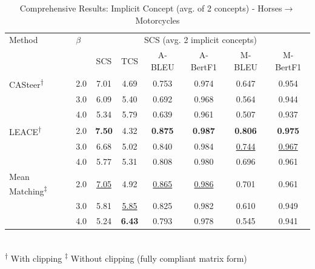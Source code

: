 \begin{table}[htbp]
\centering
\caption{Comprehensive Results: Implicit Concept (avg. of 2 concepts) - Horses$\to$Motorcycles}
\label{tab:implicitconcept_knight_s_riding_mammal_horsestomotorcycles_avg2}
\begin{tabular}{l|l|cccccc|}
\hline
Method & $\beta$ & \multicolumn{6}{c|}{SCS (avg. 2 implicit concepts)} \\
 &  & SCS & TCS & A-BLEU & A-BertF1 & M-BLEU & M-BertF1 \\
\hline
CASteer\textsuperscript{†} & 2.0 & 7.01 & 4.69 & 0.753 & 0.974 & 0.647 & 0.954 \\
 & 3.0 & 6.09 & 5.40 & 0.692 & 0.968 & 0.564 & 0.944 \\
 & 4.0 & 5.34 & 5.79 & 0.639 & 0.961 & 0.507 & 0.937 \\
\hline
LEACE\textsuperscript{†} & 2.0 & \textbf{7.50} & 4.32 & \textbf{0.875} & \textbf{0.987} & \textbf{0.806} & \textbf{0.975} \\
 & 3.0 & 6.68 & 5.02 & 0.840 & 0.984 & \underline{0.744} & \underline{0.967} \\
 & 4.0 & 5.77 & 5.31 & 0.808 & 0.980 & 0.696 & 0.961 \\
\hline
Mean Matching\textsuperscript{‡} & 2.0 & \underline{7.05} & 4.92 & \underline{0.865} & \underline{0.986} & 0.701 & 0.961 \\
 & 3.0 & 5.81 & \underline{5.85} & 0.825 & 0.982 & 0.610 & 0.949 \\
 & 4.0 & 5.24 & \textbf{6.43} & 0.793 & 0.978 & 0.545 & 0.941 \\
\hline
\end{tabular}
\\[0.5em]
\footnotesize
\textsuperscript{†} With clipping \quad \textsuperscript{‡} Without clipping (fully compliant matrix form)
\end{table}

